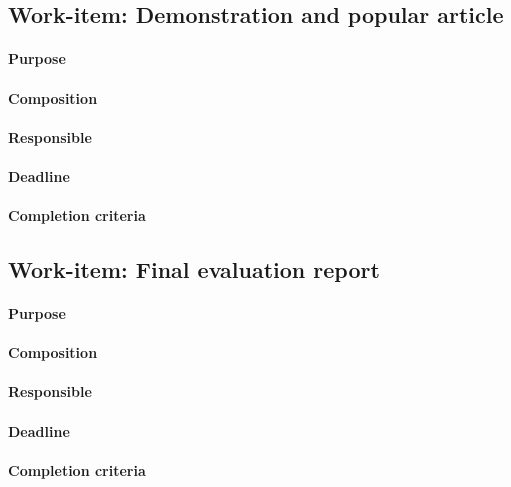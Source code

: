 \documentclass[envcountsame]{llncs}
\begin{document}
\subsection*{Work-item: Demonstration and popular article}
\paragraph{Purpose}

\paragraph{Composition}

\paragraph{Responsible}

\paragraph{Deadline}

\paragraph{Completion criteria}

\subsection*{Work-item: Final evaluation report}
\paragraph{Purpose}

\paragraph{Composition}

\paragraph{Responsible}

\paragraph{Deadline}

\paragraph{Completion criteria}



\end{document}
